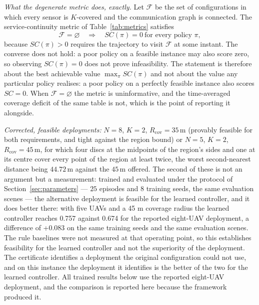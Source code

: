 \documentclass[conference]{IEEEtran}
\newcommand{\tokAltComparison}{and on this instance the deployment it identifies is the better of the two for the learned controller}
\newcommand{\tokAltEpisodes}{25}
\newcommand{\tokAltNfiveR}{44.72}
\newcommand{\tokAltSeeds}{8}
\newcommand{\tokAltVerdict}{the alternative deployment is feasible for the learned controller, and it does better there: with five UAVs and a 45 m coverage radius the learned controller reaches 0.757 against 0.674 for the reported eight-UAV deployment, a difference of +0.083 on the same training seeds and the same evaluation scenes.  The rule baselines were not measured at that operating point, so this establishes feasibility for the learned controller and not the superiority of the deployment}
\begin{document}
\emph{What the degenerate metric does, exactly.} Let $\mathcal{F}$ be the
set of configurations in which every sensor is $K$-covered and the
communication graph is connected.  The service-continuity metric of
Table~\ref{tab:metrics} satisfies
\begin{equation}
\mathcal{F}=\varnothing \quad\Longrightarrow\quad SC(\pi)=0\ \text{for every policy }\pi,
\label{eq:scdegenerate}
\end{equation}
because $SC(\pi)>0$ requires the trajectory to visit $\mathcal{F}$ at some
instant.  The converse does not hold: a poor policy on a feasible instance
may also score zero, so observing $SC(\pi)=0$ does not prove infeasibility.
The statement is therefore about the best achievable value
$\max_\pi SC(\pi)$ and not about the value any particular policy realises:
a poor policy on a perfectly feasible instance also scores $SC=0$.  When
$\mathcal{F}=\varnothing$ the metric is uninformative, and the
time-averaged coverage deficit of the same table is not, which is the
point of reporting it alongside.

\emph{Corrected, feasible deployments:} $N=8$, $K=2$, $R_{\mathrm{cov}}=35$\,m
(provably feasible for both requirements, and tight against the region
bound) or $N=5$, $K=2$, $R_{\mathrm{cov}}=45$\,m, for which four discs at
the midpoints of the region's sides and one at its centre cover every point
of the region at least twice, the worst second-nearest distance being
$\tokAltNfiveR$\,m against the $45$\,m offered. The second of these is not
an argument but a measurement: trained and evaluated under the protocol of
Section~\ref{sec:parameters} --- $\tokAltEpisodes$ episodes and
$\tokAltSeeds$ training seeds, the same evaluation scenes ---
\tokAltVerdict. The certificate identifies a deployment the original
configuration could not use, \tokAltComparison. All trained results
below use the reported eight-UAV deployment, and the comparison is
reported here because the framework produced it.
\end{document}
